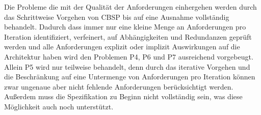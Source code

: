 Die Probleme die mit der Qualit\"at der Anforderungen einhergehen werden durch das Schrittweise Vorgehen von CBSP bis auf eine Ausnahme vollst\"andig behandelt. Dadurch dass immer nur eine kleine Menge an Anforderungen pro Iteration identifiziert, verfeinert, auf Abh\"angigkeiten und Redundanzen gepr\"uft werden und alle Anforderungen explizit oder implizit Auswirkungen auf die Architektur haben wird den Problemen P4, P6 und P7 ausreichend vorgebeugt. Allein P5 wird nur teilweise behandelt, denn durch das iterative Vorgehen und die Beschr\"ankung auf eine Untermenge von Anforderungen pro Iteration k\"onnen zwar ungenaue aber nicht fehlende Anforderungen ber\"ucksichtigt werden. Au\ss{}erdem muss die Spezifikation zu Beginn nicht vollst\"andig sein, was diese M\"oglichkeit auch noch unterst\"utzt. \\


%
